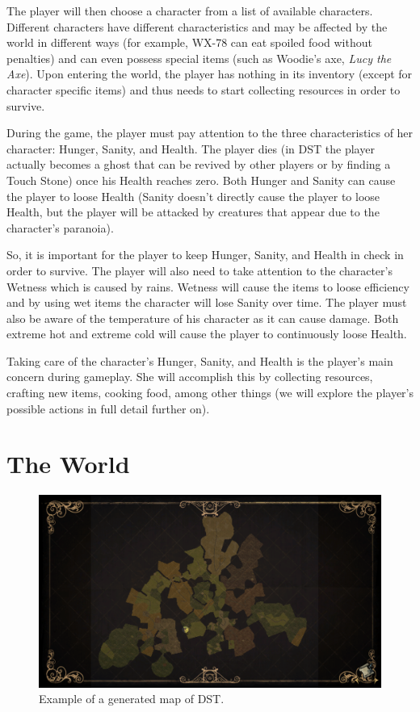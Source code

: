 The player will then choose a character from a list of available characters.
Different characters have different characteristics and may be affected by the world in different ways (for example, WX-78 can eat spoiled food without penalties) and can even possess special items (such as Woodie's axe, \textit{Lucy the Axe}).
Upon entering the world, the player has nothing in its inventory (except for character specific items) and thus needs to start collecting resources in order to survive.

During the game, the player must pay attention to the three characteristics of her character: Hunger, Sanity, and Health.
The player dies (in \ac{DST} the player actually becomes a ghost that can be revived by other players or by finding a Touch Stone) once his Health reaches zero.
Both Hunger and Sanity can cause the player to loose Health (Sanity doesn't directly cause the player to loose Health, but the player will be attacked by creatures that appear due to the character's paranoia).

So, it is important for the player to keep Hunger, Sanity, and Health in check in order to survive.
The player will also need to take attention to the character's Wetness which is caused by rains.
Wetness will cause the items to loose efficiency and by using wet items the character will lose Sanity over time.
The player must also be aware of the temperature of his character as it can cause damage.
Both extreme hot and extreme cold will cause the player to continuously loose Health.

Taking care of the character's Hunger, Sanity, and Health is the player's main concern during gameplay.
She will accomplish this by collecting resources, crafting new items, cooking food, among other things (we will explore the player's possible actions in full detail further on).

\section{The World}

\begin{figure}
  \centering
  \includegraphics[width=\textwidth]{./Images/world-map}
  \caption{Example of a generated map of \ac{DST}.}
  \label{fig:world-map}
\end{figure}

